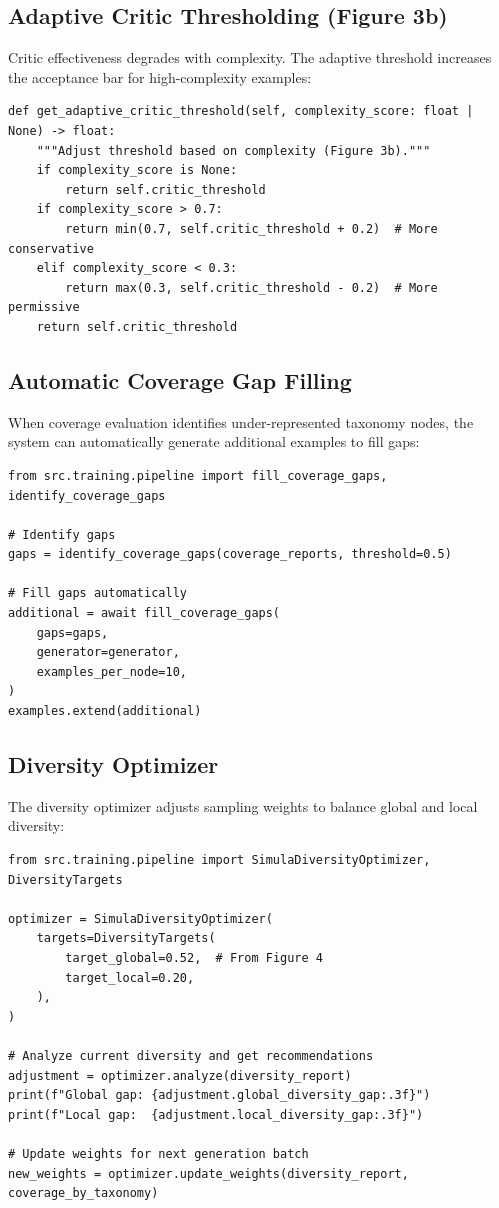 \subsection{Adaptive Critic Thresholding (Figure 3b)}

Critic effectiveness degrades with complexity. The adaptive threshold increases
the acceptance bar for high-complexity examples:

\begin{lstlisting}[language=jsonx,caption={Adaptive critic threshold}]
def get_adaptive_critic_threshold(self, complexity_score: float | None) -> float:
    """Adjust threshold based on complexity (Figure 3b)."""
    if complexity_score is None:
        return self.critic_threshold
    if complexity_score > 0.7:
        return min(0.7, self.critic_threshold + 0.2)  # More conservative
    elif complexity_score < 0.3:
        return max(0.3, self.critic_threshold - 0.2)  # More permissive
    return self.critic_threshold
\end{lstlisting}

\subsection{Automatic Coverage Gap Filling}

When coverage evaluation identifies under-represented taxonomy nodes, the system
can automatically generate additional examples to fill gaps:

\begin{lstlisting}[language=jsonx,caption={Coverage gap filling}]
from src.training.pipeline import fill_coverage_gaps, identify_coverage_gaps

# Identify gaps
gaps = identify_coverage_gaps(coverage_reports, threshold=0.5)

# Fill gaps automatically
additional = await fill_coverage_gaps(
    gaps=gaps,
    generator=generator,
    examples_per_node=10,
)
examples.extend(additional)
\end{lstlisting}

\subsection{Diversity Optimizer}

The diversity optimizer adjusts sampling weights to balance global and local diversity:

\begin{lstlisting}[language=jsonx,caption={Diversity optimizer usage}]
from src.training.pipeline import SimulaDiversityOptimizer, DiversityTargets

optimizer = SimulaDiversityOptimizer(
    targets=DiversityTargets(
        target_global=0.52,  # From Figure 4
        target_local=0.20,
    ),
)

# Analyze current diversity and get recommendations
adjustment = optimizer.analyze(diversity_report)
print(f"Global gap: {adjustment.global_diversity_gap:.3f}")
print(f"Local gap:  {adjustment.local_diversity_gap:.3f}")

# Update weights for next generation batch
new_weights = optimizer.update_weights(diversity_report, coverage_by_taxonomy)
\end{lstlisting}

